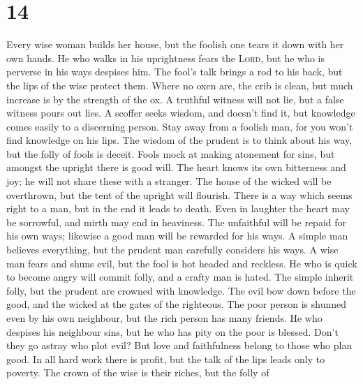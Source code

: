 \hypertarget{section-13}{%
\section{14}\label{section-13}}

 Every wise woman builds her house, but the foolish one
tears it down with her own hands.  He who walks in his
uprightness fears the \textsc{Lord}, but he who is perverse in his ways
despises him.  The fool's talk brings a rod to his back,
but the lips of the wise protect them.  Where no oxen are,
the crib is clean, but much increase is by the strength of the ox.
 A truthful witness will not lie, but a false witness
pours out lies.  A scoffer seeks wisdom, and doesn't find
it, but knowledge comes easily to a discerning person. 
Stay away from a foolish man, for you won't find knowledge on his lips.
 The wisdom of the prudent is to think about his way, but
the folly of fools is deceit.  Fools mock at making
atonement for sins, but amongst the upright there is good will.
 The heart knows its own bitterness and joy; he will not
share these with a stranger.  The house of the wicked
will be overthrown, but the tent of the upright will flourish.
 There is a way which seems right to a man, but in the
end it leads to death.  Even in laughter the heart may be
sorrowful, and mirth may end in heaviness.  The
unfaithful will be repaid for his own ways; likewise a good man will be
rewarded for his ways.  A simple man believes everything,
but the prudent man carefully considers his ways.  A wise
man fears and shuns evil, but the fool is hot headed and reckless.
 He who is quick to become angry will commit folly, and a
crafty man is hated.  The simple inherit folly, but the
prudent are crowned with knowledge.  The evil bow down
before the good, and the wicked at the gates of the righteous.
 The poor person is shunned even by his own neighbour,
but the rich person has many friends.  He who despises
his neighbour sins, but he who has pity on the poor is blessed.
 Don't they go astray who plot evil? But love and
faithfulness belong to those who plan good.  In all hard
work there is profit, but the talk of the lips leads only to poverty.
 The crown of the wise is their riches, but the folly of
